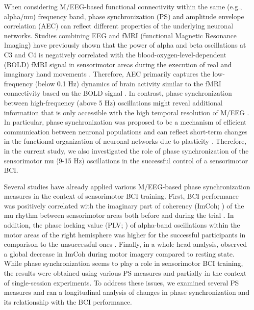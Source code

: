 When considering M/EEG-based functional connectivity within the same (e.g., alpha/mu) frequency band, phase synchronization (PS) and amplitude envelope correlation (AEC) can reflect different properties of the underlying neuronal networks. Studies combining EEG and fMRI (functional Magnetic Resonance Imaging) have previously shown that the power of alpha and beta oscillations at C3 and C4 is negatively correlated with the blood-oxygen-level-dependent (BOLD) fMRI signal in sensorimotor areas during the execution of real and imaginary hand movements \citep{Ritter2009, Yuan2010}. Therefore, AEC primarily captures the low-frequency (below 0.1 Hz) dynamics of brain activity similar to the fMRI connectivity based on the BOLD signal \citep{Engel2013}. In contrast, phase synchronization between high-frequency (above 5 Hz) oscillations might reveal additional information that is only accessible with the high temporal resolution of M/EEG \citep{Engel2013}. In particular, phase synchronization was proposed to be a mechanism of efficient communication between neuronal populations \citep{Engel2001, Fries2005, PalvaPalva2007} and can reflect short-term changes in the functional organization of neuronal networks due to plasticity \citep{Engel2013}. Therefore, in the current study, we also investigated the role of phase synchronization of the sensorimotor mu (9-15 Hz) oscillations in the successful control of a sensorimotor BCI.

\medskip

Several studies have already applied various M/EEG-based phase synchronization measures in the context of sensorimotor BCI training. First, BCI performance was positively correlated with the imaginary part of coherency (ImCoh; \cite{Nolte2004}) of the mu rhythm between sensorimotor areas both before and during the trial \citep{Sugata2014, Vidaurre2020}. In addition, the phase locking value (PLV; \cite{Lachaux1999}) of alpha-band oscillations within the motor areas of the right hemisphere was higher for the successful participants in comparison to the unsuccessful ones \citep{Leeuwis2021}. Finally, in a whole-head analysis, \cite{Corsi2020} observed a global decrease in ImCoh during motor imagery compared to resting state. While phase synchronization seems to play a role in sensorimotor BCI training, the results were obtained using various PS measures and partially in the context of single-session experiments. To address these issues, we examined several PS measures and ran a longitudinal analysis of changes in phase synchronization and its relationship with the BCI performance.

